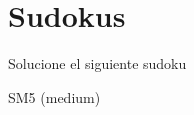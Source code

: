 \documentclass[10pt,addpoints]{exam}
\begin{document}
\begin{minipage}{.5\textwidth}
\begin{center}
\gradetable[h][pages]
\end{center} 
\end{minipage}
\begin{minipage}{.5\textwidth}
 \begin{center}
\gradetable[h][pages]
\end{center}
\end{minipage}
\newpage
\section*{Sudokus}
Solucione el siguiente sudoku

\begin{minipage}{0.75\linewidth}\begin{center}
SM5 (medium) \\
\end{center}\end{minipage}
\end{document}

